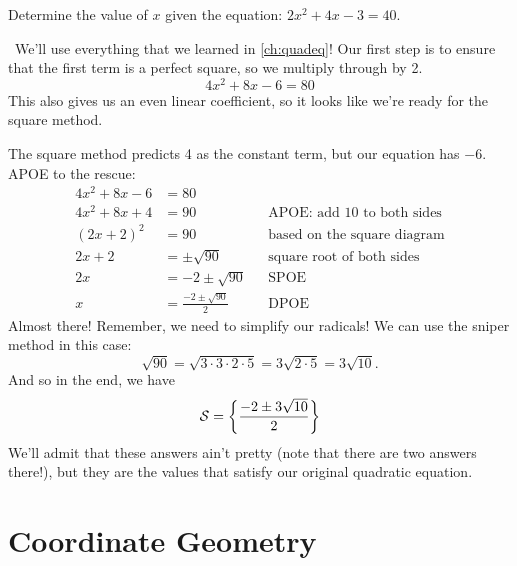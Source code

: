\begin{boxedex}
Determine the value of $x$ given the equation: $2x^2+4x-3=40$.

\exsoln\ We'll use everything that we learned in \cref{ch:quadeq}! Our first step is to ensure that the first term is a perfect square, so we multiply through by 2.
\[4x^2 + 8x - 6 = 80\]
This also gives us an even linear coefficient, so it looks like we're ready for the square method.
\begin{center}
\end{center}
The square method predicts 4 as the constant term, but our equation has $-6$. APOE to the rescue:
\begin{align*}
4x^2 + 8x - 6 &= 80
\\
4x^2 + 8x + 4 &= 90
&&\text{APOE: add 10 to both sides}
\\
(2x+2)^2 &= 90
&&\text{based on the square diagram}
\\
2x+2 &= \pm\sqrt{90}
&&\text{square root of both sides}
\\
2x &= -2 \pm\sqrt{90}
&&\text{SPOE}
\\[1ex]
x &= \frac{-2 \pm\sqrt{90}}{2}
&&\text{DPOE}
\end{align*}
Almost there! Remember, we need to simplify our radicals! We can use the sniper method in this case:
\[\sqrt{90} = \sqrt{3\cdot3\cdot2\cdot5} = 3\sqrt{2\cdot5} = 3\sqrt{10}.\]
And so in the end, we have
\[\mathcal{S}=\left\{\frac{-2 \pm 3\sqrt{10}}{2}\right\}\]
We'll admit that these answers ain't pretty (note that there are two answers there!), but they are the values that satisfy our original quadratic equation.
\end{boxedex}

\section{Coordinate Geometry}
\label{sec:coordgeometry}

